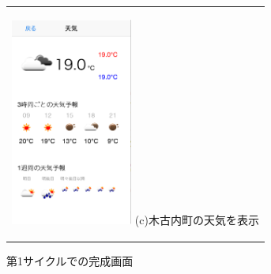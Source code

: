 \begin{figure}[htbp]
\begin{center}
\begin{tabular}{c}
      \begin{minipage}{0.33\hsize}
        \begin{center}
\includegraphics[width=4cm, bb=0 0 320 549]{5.3_weather.png}
          \hspace{1cm} %
          {\footnotesize (c)木古内町の天気を表示}
        \end{center}
      \end{minipage}

    \end{tabular}
    \caption{第1サイクルでの完成画面 }
    
    \label{fig:lena}
  \end{center}
\end{figure}
